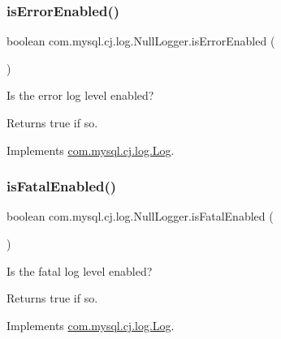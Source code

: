 \subsubsection{\texorpdfstring{is\+Error\+Enabled()}{isErrorEnabled()}}
{\footnotesize\ttfamily boolean com.\+mysql.\+cj.\+log.\+Null\+Logger.\+is\+Error\+Enabled (\begin{DoxyParamCaption}{ }\end{DoxyParamCaption})}

Is the \textquotesingle{}error\textquotesingle{} log level enabled?

\begin{DoxyReturn}{Returns}
true if so. 
\end{DoxyReturn}


Implements \mbox{\hyperlink{interfacecom_1_1mysql_1_1cj_1_1log_1_1_log_abda4b698026fdb26c74b211b521628c9}{com.\+mysql.\+cj.\+log.\+Log}}.

\mbox{\label{classcom_1_1mysql_1_1cj_1_1log_1_1_null_logger_a70814db9a009e9da80bc67c4e084120c}} 
\subsubsection{\texorpdfstring{is\+Fatal\+Enabled()}{isFatalEnabled()}}
{\footnotesize\ttfamily boolean com.\+mysql.\+cj.\+log.\+Null\+Logger.\+is\+Fatal\+Enabled (\begin{DoxyParamCaption}{ }\end{DoxyParamCaption})}

Is the \textquotesingle{}fatal\textquotesingle{} log level enabled?

\begin{DoxyReturn}{Returns}
true if so. 
\end{DoxyReturn}


Implements \mbox{\hyperlink{interfacecom_1_1mysql_1_1cj_1_1log_1_1_log_a61464d2603e609442da19c59c5c62f62}{com.\+mysql.\+cj.\+log.\+Log}}.

\mbox{\label{classcom_1_1mysql_1_1cj_1_1log_1_1_null_logger_af0ad62bbe84bd85359d474e58cd94316}} 
